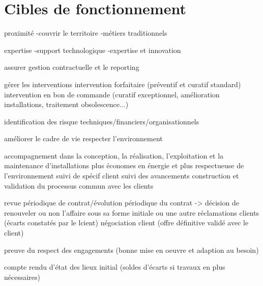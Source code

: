 \chapter{Cibles de fonctionnement}

proximité
-couvrir le territoire
-métiers traditionnels

expertise
-support technologique
-expertise et innovation

assurer gestion contractuelle et le reporting

gérer les interventions
intervention forfaitaire (préventif et curatif standard)
intervention en bon de commande (curatif exceptionnel, amélioration installations, traitement obsolescence...)

identification des risque techniques/financiers/organisationnels

améliorer le cadre de vie
respecter l'environnement

accompagnement dans la conception, la réalisation, l'exploitation et la maintenance d'installations plus économes en énergie et plus respectueuse de l'environnement
suivi de spécif client
suivi des avancements
construction et validation du processus commun avec les clients

revue périodique de contrat/évolution périodique du contrat -> décision de renouveler ou non l'affaire sous sa forme initiale ou une autre
réclamations clients (écarts constatés par le lcient)
négociation client (offre définitive validé avec le client)

preuve du respect des engagements (bonne mise en oeuvre et adaption au besoin)

compte rendu d'état des lieux initial (soldes d'écarts si travaux en plus nécessaires)